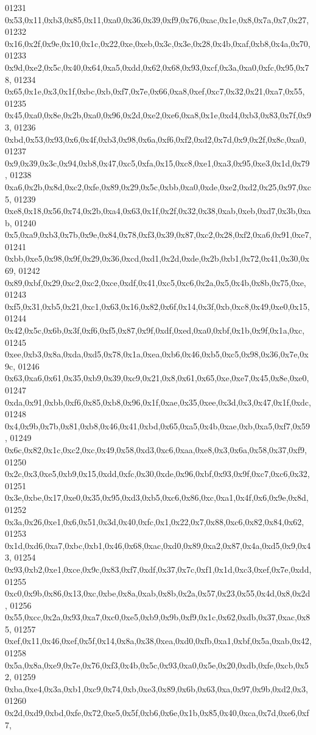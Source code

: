 \begin{DoxyCode}
01231   0x53,0x11,0xb3,0x85,0x11,0xa0,0x36,0x39,0xf9,0x76,0xac,0x1e,0x8,0x7a,0x7,0x27,
01232   0x16,0x2f,0x9e,0x10,0x1c,0x22,0xe,0xeb,0x3c,0x3e,0x28,0x4b,0xaf,0xb8,0x4a,0x70,
01233   0x9d,0xe2,0x5c,0x40,0x64,0xa5,0xdd,0x62,0x68,0x93,0xcf,0x3a,0xa0,0xfc,0x95,0x78,
01234   0x65,0x1e,0x3,0x1f,0xbc,0xb,0xf7,0x7e,0x66,0xa8,0xef,0xc7,0x32,0x21,0xa7,0x55,
01235   0x45,0xa0,0x8e,0x2b,0xa0,0x96,0x2d,0xe2,0xe6,0xa8,0x1e,0xd4,0xb3,0x83,0x7f,0x93,
01236   0xbd,0x53,0x93,0x6,0x4f,0xb3,0x98,0x6a,0xf6,0xf2,0xd2,0x7d,0x9,0x2f,0x8c,0xa0,
01237   0x9,0x39,0x3c,0x94,0xb8,0x47,0xc5,0xfa,0x15,0xc8,0xe1,0xa3,0x95,0xe3,0x1d,0x79,
01238   0xa6,0x2b,0x8d,0xc2,0xfe,0x89,0x29,0x5c,0xbb,0xa0,0xde,0xe2,0xd2,0x25,0x97,0xc5,
01239   0xe8,0x18,0x56,0x74,0x2b,0xa4,0x63,0x1f,0x2f,0x32,0x38,0xab,0xeb,0xd7,0x3b,0xab,
01240   0x5,0xa9,0xb3,0x7b,0x9e,0x84,0x78,0xf3,0x39,0x87,0xc2,0x28,0xf2,0xa6,0x91,0xe7,
01241   0xbb,0xe5,0x98,0x9f,0x29,0x36,0xcd,0xd1,0x2d,0xde,0x2b,0xb1,0x72,0x41,0x30,0x69,
01242   0x89,0xbf,0x29,0xc2,0xc2,0xce,0xdf,0x41,0xc5,0xc6,0x2a,0x5,0x4b,0x8b,0x75,0xe,
01243   0xf5,0x31,0xb5,0x21,0xc1,0x63,0x16,0x82,0x6f,0x14,0x3f,0xb,0xc8,0x49,0xe0,0x15,
01244   0x42,0x5c,0x6b,0x3f,0xf6,0xf5,0x87,0x9f,0xdf,0xed,0xa0,0xbf,0x1b,0x9f,0x1a,0xc,
01245   0xee,0xb3,0x8a,0xda,0xd5,0x78,0x1a,0xea,0xb6,0x46,0xb5,0xc5,0x98,0x36,0x7e,0x9c,
01246   0x63,0xa6,0x61,0x35,0xb9,0x39,0xc9,0x21,0x8,0x61,0x65,0xe,0xe7,0x45,0x8e,0xe0,
01247   0xda,0x91,0xbb,0xf6,0x85,0xb8,0x96,0x1f,0xae,0x35,0xee,0x3d,0x3,0x47,0x1f,0xdc,
01248   0x4,0x9b,0x7b,0x81,0xb8,0x46,0x41,0xbd,0x65,0xa5,0x4b,0xae,0xb,0xa5,0xf7,0x59,
01249   0x6c,0x82,0x1c,0xc2,0xc,0x49,0x58,0xd3,0xc6,0xaa,0xe8,0x3,0x6a,0x58,0x37,0xf9,
01250   0x2c,0x3,0xe5,0xb9,0x15,0xdd,0xfc,0x30,0xde,0x96,0xbf,0x93,0x9f,0xc7,0xc6,0x32,
01251   0x3e,0xbe,0x17,0xe0,0x35,0x95,0xd3,0xb5,0xc6,0x86,0xc,0xa1,0x4f,0x6,0x9e,0x8d,
01252   0x3a,0x26,0xe1,0x6,0x51,0x3d,0x40,0xfc,0x1,0x22,0x7,0x88,0xc6,0x82,0x84,0x62,
01253   0x1d,0xd6,0xa7,0xbc,0xb1,0x46,0x68,0xac,0xd0,0x89,0xa2,0x87,0x4a,0xd5,0x9,0x43,
01254   0x93,0xb2,0xe1,0xce,0x9c,0x83,0xf7,0xdf,0x37,0x7c,0xf1,0x1d,0xc3,0xef,0x7e,0xdd,
01255   0xc0,0x9b,0x86,0x13,0xc,0xbe,0x8a,0xab,0x8b,0x2a,0x57,0x23,0x55,0x4d,0x8,0x2d,
01256   0x55,0xcc,0x2a,0x93,0xa7,0xc0,0xe5,0xb9,0x9b,0xf9,0x1c,0x62,0xdb,0x37,0xac,0x85,
01257   0xef,0x11,0x46,0xef,0x5f,0x14,0x8a,0x38,0xea,0xd0,0xfb,0xa1,0xbf,0x5a,0xab,0x42,
01258   0x5a,0x8a,0xe9,0x7e,0x76,0xf3,0x4b,0x5c,0x93,0xa0,0x5e,0x20,0xdb,0xfe,0xcb,0x52,
01259   0xba,0xe4,0x3a,0xb1,0xc9,0x74,0xb,0xe3,0x89,0x6b,0x63,0xa,0x97,0x9b,0xd2,0x3,
01260   0x2d,0xd9,0xbd,0xfe,0x72,0xe5,0x5f,0xb6,0x6e,0x1b,0x85,0x40,0xca,0x7d,0xe6,0xf7,

\end{DoxyCode}
